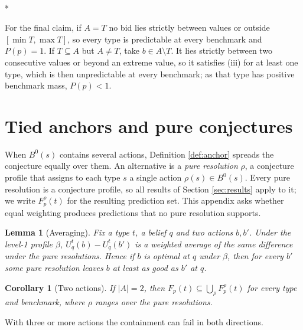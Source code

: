 \documentclass[12pt]{article}
\makeatletter
\newtheorem{lemma}{Lemma}
\newtheorem{corollary}{Corollary}
\theoremstyle{definition}
\renewenvironment{proof}[1][\proofname]{\par
  \pushQED{\qed}%
  \normalfont \topsep6\p@\@plus6\p@\relax
  \trivlist
  \item[\hskip\labelsep\itshape #1\@addpunct{.}]\mbox{}\\*
  \ignorespaces
}{%
  \popQED\endtrivlist\@endpefalse
}
\makeatother
\begin{document}
\begin{proof}[Proof of Corollary \ref{th:gaps}]
For the final claim, if $A = T$ no bid lies strictly between values or outside $[\min T, \max T]$, so every type is predictable at every benchmark and $P(p) = 1$. If $T \subseteq A$ but $A \neq T$, take $b \in A \setminus T$. It lies strictly between two consecutive values or beyond an extreme value, so it satisfies (iii) for at least one type, which is then unpredictable at every benchmark; as that type has positive benchmark mass, $P(p) < 1$.
\end{proof}

\section{Tied anchors and pure conjectures}\label{app:resolutions}

When $B^0(s)$ contains several actions, Definition \ref{def:anchor} spreads the conjecture equally over them. An alternative is a \emph{pure resolution} $\rho$, a conjecture profile that assigns to each type $s$ a single action $\rho(s) \in B^0(s)$. Every pure resolution is a conjecture profile, so all results of Section \ref{sec:results} apply to it; we write $F^\rho_p(t)$ for the resulting prediction set. This appendix asks whether equal weighting produces predictions that no pure resolution supports.

\begin{lemma}[Averaging]\label{lem:pairwise}
Fix a type $t$, a belief $q$ and two actions $b, b'$. Under the level-1 profile $\beta$, $U^t_q(b) - U^t_q(b')$ is a weighted average of the same difference under the pure resolutions. Hence if $b$ is optimal at $q$ under $\beta$, then for every $b'$ some pure resolution leaves $b$ at least as good as $b'$ at $q$.
\end{lemma}

\begin{corollary}[Two actions]\label{cor:binary}
If $|A| = 2$, then $F_p(t) \subseteq \bigcup_{\rho} F^{\rho}_p(t)$ for every type and benchmark, where $\rho$ ranges over the pure resolutions.
\end{corollary}

With three or more actions the containment can fail in both directions.
\end{document}
